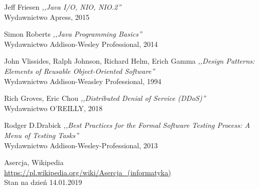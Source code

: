 \documentclass[12pt, twoside]{report}
\begin{document}
\begin{thebibliography}{9}
Jeff Friesen \emph{ ,,Java I/O, NIO, NIO.2'' }\\ Wydawnictwo Apress, 2015

Simon Roberts \emph{ ,,Java Programming Basics'' }\\ Wydawnictwo Addison-Wesley Professional, 2014

John Vlissides, Ralph Johnson, Richard Helm, Erich Gamma \emph{ ,,Design Patterns: Elements of Reusable Object-Oriented Software'' }\\ Wydawnictwo Addison-Weasley Professional, 1994

Rich Groves, Eric Chou \emph{ ,,Distributed Denial of Service (DDoS)'' }\\ Wydawnictwo O'REILLY, 2018

Rodger D.Drabick \emph{ ,,Best Practices for the Formal Software Testing Process: A Menu of Testing Tasks'' }\\ Wydawnictwo Addison-Wesley-Professional, 2013

Asercja, Wikipedia \\
\url{https://pl.wikipedia.org/wiki/Asercja_(informatyka)} \\
Stan na dzień 14.01.2019

\end{thebibliography}
\end{document}
